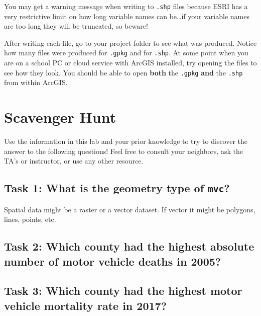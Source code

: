 \documentclass[
]{book}
\newenvironment{rmdcaution}[1]
  {
  \begin{itemize}
  \renewcommand{\labelitemi}{
    \raisebox{-.7\height}[0pt][0pt]{
      {\setkeys{Gin}{width=3em,keepaspectratio}\texttt{[image: images/\#1]}}
    }
  }
  \setlength{\fboxsep}{1em}
  \begin{caution}
  \item
  }
  {
  \end{caution}
  \end{itemize}
  }
\begin{document}
\begin{rmdcaution}{caution}
You may get a warning message when writing to \texttt{.shp} files because ESRI has a very restrictive limit on how long variable names can be\ldots if your variable names are too long they will be truncated, so beware!

\end{rmdcaution}

After writing each file, go to your project folder to see what was produced. Notice how many files were produced for \texttt{.gpkg} and for \texttt{.shp}. At some point when you are on a school PC or cloud service with ArcGIS installed, try opening the files to see how they look. You should be able to open \textbf{both} the \texttt{.gpkg} \textbf{and} the \texttt{.shp} from within ArcGIS.

\hypertarget{scavenger-hunt}{%
\section{Scavenger Hunt}\label{scavenger-hunt}}

Use the information in this lab and your prior knowledge to try to discover the answer to the following questions! Feel free to consult your neighbors, ask the TA's or instructor, or use any other resource.

\hypertarget{task-1-what-is-the-geometry-type-of-mvc}{%
\subsection{\texorpdfstring{Task 1: What is the geometry type of \texttt{mvc}?}{Task 1: What is the geometry type of mvc?}}\label{task-1-what-is-the-geometry-type-of-mvc}}

Spatial data might be a raster or a vector dataset. If vector it might be polygons, lines, points, etc.

\hypertarget{task-2-which-county-had-the-highest-absolute-number-of-motor-vehicle-deaths-in-2005}{%
\subsection{Task 2: Which county had the highest absolute number of motor vehicle deaths in 2005?}\label{task-2-which-county-had-the-highest-absolute-number-of-motor-vehicle-deaths-in-2005}}

\hypertarget{task-3-which-county-had-the-highest-motor-vehicle-mortality-rate-in-2017}{%
\subsection{Task 3: Which county had the highest motor vehicle mortality rate in 2017?}\label{task-3-which-county-had-the-highest-motor-vehicle-mortality-rate-in-2017}}
\end{document}
